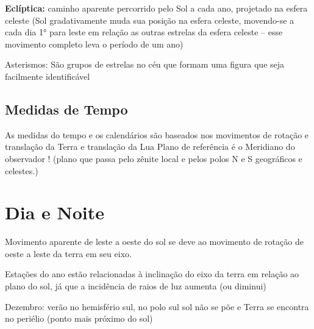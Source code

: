 \documentclass{article}
\begin{document}
\textbf{Eclíptica:} caminho aparente percorrido pelo Sol a cada 
ano, projetado na esfera celeste (Sol gradativamente muda sua 
posição na esfera celeste, movendo-se a cada dia 1° para leste 
em relação as outras estrelas da esfera celeste –  esse 
movimento completo leva o período de um ano)

Asterismos: São grupos de estrelas no céu que formam uma 
figura que seja facilmente identificável

\subsection{Medidas de Tempo}

As medidas do tempo e os calendários são baseados nos 
movimentos de rotação e translação da Terra e translação da Lua
Plano de referência é o Meridiano do observador !
(plano que passa pelo zênite local e pelos polos N e S geográficos 
e celestes.)

\section{Dia e Noite}

Movimento aparente de leste a oeste do sol se deve ao movimento de 
rotação de oeste a leste da terra em seu eixo.

Estações do ano estão relacionadas à inclinação do eixo da terra
em relação ao plano do sol, já que a incidência de raios de luz 
aumenta (ou diminui)

Dezembro: verão no hemisfério sul, no polo sul sol não se põe e 
Terra se encontra no periélio (ponto mais próximo do sol)
\end{document}
